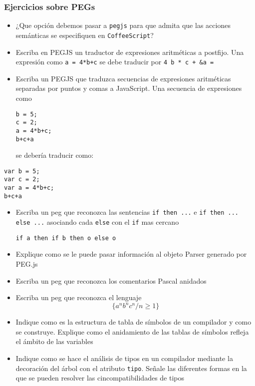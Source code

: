 \subsubsection{Ejercicios sobre PEGs}\label{ejercicios-sobre-pegs}

\begin{itemize}
\item
  ¿Que opción debemos pasar a \texttt{pegjs} para que admita que las
  acciones semánticas se especifiquen en \texttt{CoffeeScript}?
\item
  Escriba en PEGJS un traductor de expresiones aritméticas a postfijo.
  Una expresión como \texttt{a = 4*b+c} se debe traducir por
  \texttt{4 b * c + \&a =}
\item
  Escriba un PEGJS que traduzca secuencias de expresiones aritméticas
  separadas por puntos y comas a JavaScript. Una secuencia de
  expresiones como

\begin{verbatim}
b = 5;
c = 2;
a = 4*b+c;
b+c+a 
\end{verbatim}

  se debería traducir como:
\end{itemize}

\begin{verbatim}
var b = 5;
var c = 2;
var a = 4*b+c;
b+c+a
\end{verbatim}

\begin{itemize}
\item
  Escriba un peg que reconozca las sentencias \texttt{if then ...} e
  \texttt{if then ... else ...} asociando cada \texttt{else} con el
  \texttt{if} mas cercano

\begin{verbatim}
if a then if b then o else o
\end{verbatim}
\item
  Explique como se le puede pasar información al objeto Parser generado
  por PEG.js
\item
  Escriba un peg que reconozca los comentarios Pascal anidados
\item
  Escriba un peg que reconozca el lenguaje
  \[ \{ a^nb^nc^n / n \ge 1 \} \]
\item
  Indique como es la estructura de tabla de símbolos de un compilador y
  como se construye. Explique como el anidamiento de las tablas de
  símbolos refleja el ámbito de las variables
\item
  Indique como se hace el análisis de tipos en un compilador mediante la
  decoración del árbol con el atributo \texttt{tipo}. Señale las
  diferentes formas en la que se pueden resolver las cincompatibilidades
  de tipos
\end{itemize}

